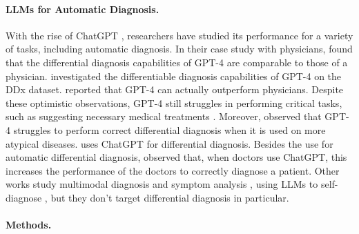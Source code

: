 \paragraph{LLMs for Automatic Diagnosis.} With the rise of ChatGPT \cite{achiam2023gpt}, researchers have studied its performance for a variety of tasks, including automatic diagnosis. In their case study with physicians, \citet{hirosawa2023chatgpt} found that the differential diagnosis capabilities of GPT-4 are comparable to those of a physician. \citet{mizuta2024diagnosis} investigated the differentiable diagnosis capabilities of GPT-4 on the DDx dataset. \citet{rutledge2024diagnostic} reported that GPT-4 can actually outperform physicians. Despite these optimistic observations, GPT-4 still struggles in performing critical tasks, such as suggesting necessary medical treatments \cite{fabre2024evaluating}. Moreover, 
\citet{shikino2024evaluation} observed that GPT-4 struggles to perform correct differential diagnosis when it is used on more atypical diseases.
\citet{ten2024chatgpt} uses ChatGPT for differential diagnosis. %
Besides the use for automatic differential diagnosis, \citet{ten2024chatgpt} observed that, when doctors use ChatGPT, this increases the performance of the doctors to correctly diagnose a patient. Other works study multimodal diagnosis and symptom analysis \cite{panagoulias2024evaluating}, using LLMs to self-diagnose \cite{balasubramanian2024can}, but they don't target differential diagnosis in particular.

\paragraph{Methods.}



